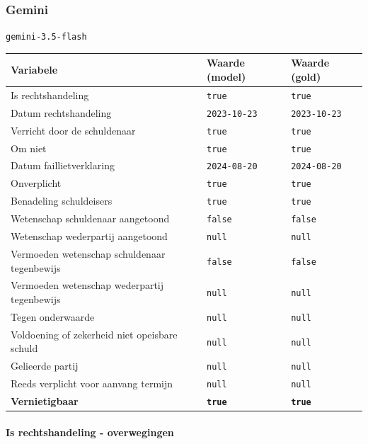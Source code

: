 \documentclass[
  dutch,
  a4paper,
]{article}
\begin{document}
\newpage


\subsubsection{Gemini}\label{gemini-11}

\texttt{gemini-3.5-flash}

\begin{center}
\small
\begin{tabular}{@{}p{7.4cm}p{2.6cm}p{2.6cm}@{}}
\toprule
Variabele & Waarde (model) & Waarde (gold) \\
\midrule
Is rechtshandeling & \texttt{true} & \texttt{true} \\
Datum rechtshandeling & \texttt{2023-10-23} & \texttt{2023-10-23} \\
Verricht door de schuldenaar & \texttt{true} & \texttt{true} \\
Om niet & \texttt{true} & \texttt{true} \\
Datum faillietverklaring & \texttt{2024-08-20} & \texttt{2024-08-20} \\
Onverplicht & \texttt{true} & \texttt{true} \\
Benadeling schuldeisers & \texttt{true} & \texttt{true} \\
Wetenschap schuldenaar aangetoond & \texttt{false} & \texttt{false} \\
Wetenschap wederpartij aangetoond & \texttt{null} & \texttt{null} \\
Vermoeden wetenschap schuldenaar tegenbewijs & \texttt{false} & \texttt{false} \\
Vermoeden wetenschap wederpartij tegenbewijs & \texttt{null} & \texttt{null} \\
Tegen onderwaarde & \texttt{null} & \texttt{null} \\
Voldoening of zekerheid niet opeisbare schuld & \texttt{null} & \texttt{null} \\
Gelieerde partij & \texttt{null} & \texttt{null} \\
Reeds verplicht voor aanvang termijn & \texttt{null} & \texttt{null} \\
\textbf{Vernietigbaar} & \textbf{\texttt{true}} & \textbf{\texttt{true}} \\
\bottomrule
\end{tabular}
\end{center}

\paragraph{Is rechtshandeling - overwegingen}\label{is-rechtshandeling---overwegingen-35}
\end{document}

